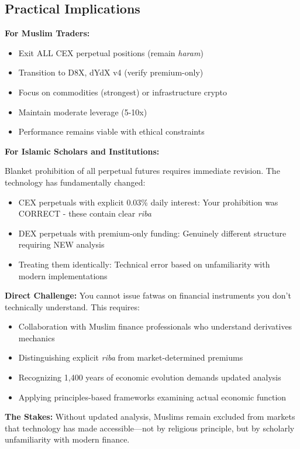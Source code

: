 \documentclass[10pt,twocolumn]{article}
\begin{document}
\subsection{Practical Implications}

\textbf{For Muslim Traders:}
\begin{itemize}
    \item Exit ALL CEX perpetual positions (remain \textit{haram})
    \item Transition to D8X, dYdX v4 (verify premium-only)
    \item Focus on commodities (strongest) or infrastructure crypto
    \item Maintain moderate leverage (5-10x)
    \item Performance remains viable with ethical constraints
\end{itemize}

\textbf{For Islamic Scholars and Institutions:}

Blanket prohibition of all perpetual futures requires immediate revision. The technology has fundamentally changed:

\begin{itemize}
    \item CEX perpetuals with explicit 0.03\% daily interest: Your prohibition was CORRECT - these contain clear \textit{riba}
    \item DEX perpetuals with premium-only funding: Genuinely different structure requiring NEW analysis
    \item Treating them identically: Technical error based on unfamiliarity with modern implementations
\end{itemize}

\textbf{Direct Challenge:} You cannot issue fatwas on financial instruments you don't technically understand. This requires:
\begin{itemize}
    \item Collaboration with Muslim finance professionals who understand derivatives mechanics
    \item Distinguishing explicit \textit{riba} from market-determined premiums
    \item Recognizing 1,400 years of economic evolution demands updated analysis
    \item Applying principles-based frameworks examining actual economic function
\end{itemize}

\textbf{The Stakes:} Without updated analysis, Muslims remain excluded from markets that technology has made accessible—not by religious principle, but by scholarly unfamiliarity with modern finance.
\end{document}
